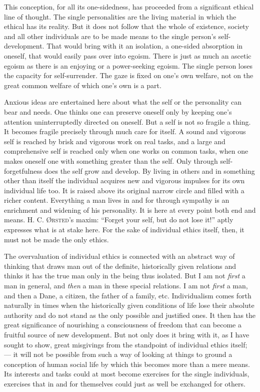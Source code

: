 \documentclass[12pt,a4paper,openany]{book}
\newcommand{\opage}[1]{\marginnote{\footnotesize\textit{[#1]}}}
\begin{document}
This conception, for all its one-sidedness, has proceeded from a significant ethical line of thought. The
single personalities are the living material in which the ethical has its reality. But it does not follow
that the whole of existence, society and all other individuals are to be made means to the single person's
self-development. That would bring with it an isolation, a one-sided absorption in oneself, that would easily
pass over into egoism. There is just as much an ascetic egoism as there is an enjoying or a power-seeking
egoism. The single person loses the capacity for self-surrender. The gaze is fixed on one's own welfare, not on
the great common welfare of which one's own is a part.

Anxious ideas are entertained here about what the self or the personality can bear and needs. One thinks one
can preserve oneself only by keeping one's attention uninterruptedly directed on oneself. But a self is not so
fragile a thing. It becomes fragile precisely through much care for itself. A sound and vigorous self is
reached by brisk and vigorous work on real tasks, and a large and comprehensive self is reached only when one
works on common tasks, when one makes oneself one with something greater than the self. Only through
self-forgetfulness does the self grow and develop. By living in others and in something other than itself the
individual acquires new and vigorous impulses for its own individual life too. It is raised above its
original narrow circle and filled with a richer content. Everything a man lives in and for through sympathy is
an enrichment and widening of his personality. It is here at every point both end and means. H. C.
\textsc{Ørsted}'s maxim: ``Forget your self, but do not lose it!'' aptly expresses what is at stake here.
\opage{163}For the sake of individual ethics itself, then, it must not be made the only ethics.

The overvaluation of individual ethics is connected with an abstract way of thinking that draws man out of the
definite, historically given relations and thinks it has the true man only in the being thus isolated. But I
am not \textit{first} a man in general, and \textit{then} a man in these special relations. I am not
\textit{first} a man, and then a Dane, a citizen, the father of a family, etc. Individualism comes forth
naturally in times when the historically given conditions of life lose their absolute authority and do not
stand as the only possible and justified ones. It then has the great significance of nourishing a
consciousness of freedom that can become a fruitful source of new development. But not only does it bring with
it, as I have sought to show, great misgivings from the standpoint of individual ethics itself; --- it will not
be possible from such a way of looking at things to ground a conception of human social life by which this
becomes more than a mere means. Its interests and tasks could at most become exercises for the single
individuals, exercises that in and for themselves could just as well be exchanged for others.
\end{document}
